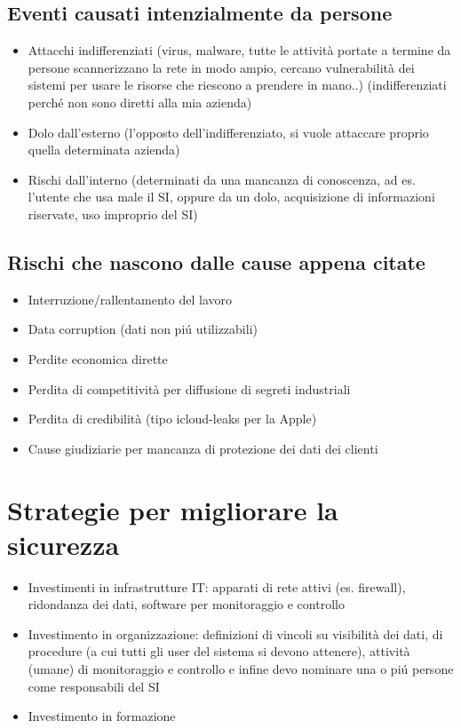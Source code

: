 \subsection{Eventi causati intenzialmente da persone}

\begin{itemize}

\item
  Attacchi indifferenziati (virus, malware, tutte le attivit\`a portate a
  termine da persone scannerizzano la rete in modo ampio, cercano
  vulnerabilit\`a dei sistemi per usare le risorse che riescono a prendere
  in mano..) (indifferenziati perch\'e non sono diretti alla mia azienda)
\item
  Dolo dall'esterno (l'opposto dell'indifferenziato, si vuole attaccare
  proprio quella determinata azienda)
\item
  Rischi dall'interno (determinati da una mancanza di conoscenza, ad es.
  l'utente che usa male il SI, oppure da un dolo, acquisizione di
  informazioni riservate, uso improprio del SI)
\end{itemize}

\subsection{Rischi che nascono dalle cause appena citate}

\begin{itemize}

\item
  Interruzione/rallentamento del lavoro
\item
  Data corruption (dati non pi\'u utilizzabili)
\item
  Perdite economica dirette
\item
  Perdita di competitivit\`a per diffusione di segreti industriali
\item
  Perdita di credibilit\`a (tipo icloud-leaks per la Apple)
\item
  Cause giudiziarie per mancanza di protezione dei dati dei clienti
\end{itemize}

\section{Strategie per migliorare la sicurezza}

\begin{itemize}

\item
  Investimenti in infrastrutture IT: apparati di rete attivi (es. firewall), ridondanza dei dati, software per monitoraggio e controllo
\item
  Investimento in organizzazione: definizioni di vincoli su visibilit\`a dei dati,
  di procedure (a cui tutti gli user del sistema si devono attenere),
  attivit\`a (umane) di monitoraggio e controllo e infine devo nominare
  una o pi\'u persone come responsabili del SI
\item
  Investimento in formazione
\end{itemize}

